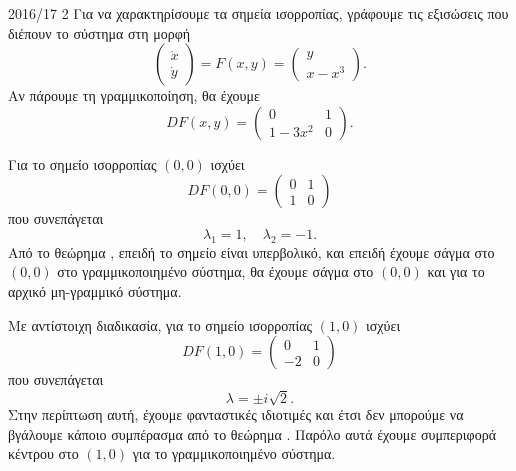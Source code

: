 \begin{solution}{2016/17 2}
    Για να χαρακτηρίσουμε τα σημεία ισορροπίας, γράφουμε τις εξισώσεις που
    διέπουν το σύστημα στη μορφή
    \begin{equation*}
        \begin{pmatrix}
            \dot{x} \\
            \dot{y}
        \end{pmatrix} = F(x, y) =
        \begin{pmatrix}
            y \\
            x - x^3
        \end{pmatrix}.
    \end{equation*}
    Αν πάρουμε τη γραμμικοποίηση, θα έχουμε
    \begin{equation*}
        DF(x, y) =
        \begin{pmatrix}
            0 & 1 \\
            1 - 3x^2 & 0
        \end{pmatrix}.
    \end{equation*}

    Για το σημείο ισορροπίας \( (0, 0) \) ισχύει
    \begin{equation*}
        DF(0, 0) =
        \begin{pmatrix}
            0 & 1 \\
            1 & 0
        \end{pmatrix}
    \end{equation*}
    που συνεπάγεται
    \begin{equation*}
        \lambda_1 = 1, \quad \lambda_2 = -1.
    \end{equation*}
    Από το θεώρημα , επειδή το σημείο είναι
    υπερβολικό, και επειδή έχουμε σάγμα στο \( (0, 0) \) στο γραμμικοποιημένο
    σύστημα, θα έχουμε σάγμα στο \( (0, 0) \) και για το αρχικό μη-γραμμικό
    σύστημα.

    Με αντίστοιχη διαδικασία, για το σημείο ισορροπίας \( (1, 0) \) ισχύει
    \begin{equation*}
        DF(1, 0) =
        \begin{pmatrix}
            0 & 1 \\
            -2 & 0
        \end{pmatrix}
    \end{equation*}
    που συνεπάγεται
    \begin{equation*}
        \lambda = \pm i\sqrt{2}.
    \end{equation*}
    Στην περίπτωση αυτή, έχουμε φανταστικές ιδιοτιμές και έτσι δεν μπορούμε να
    βγάλουμε κάποιο συμπέρασμα από το θεώρημα . Παρόλο αυτά
    έχουμε συμπεριφορά κέντρου στο \( (1, 0) \) για το γραμμικοποιημένο σύστημα.


\end{solution}
